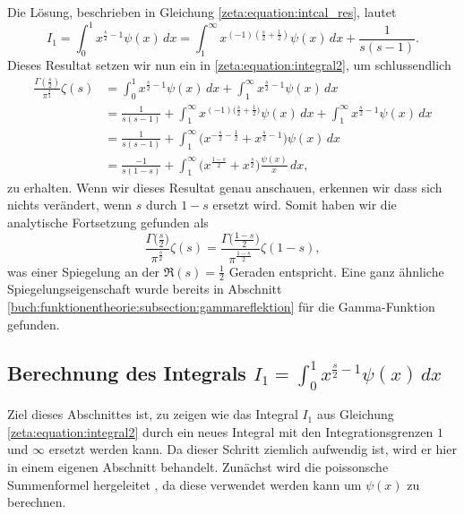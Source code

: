 Die Lösung, beschrieben in Gleichung \eqref{zeta:equation:intcal_res}, lautet
\begin{equation*}
    I_1
    =
    \int_0^{1}
    x^{\frac{s}{2}-1}
    \psi(x)
    \,dx
    =
    \int_{1}^{\infty}
    x^{(-1) (\frac{s}{2}+\frac{1}{2})}
    \psi(x)
    \,dx
    +
    \frac{1}{s(s-1)}.
\end{equation*}
Dieses Resultat setzen wir nun ein in \eqref{zeta:equation:integral2}, um schlussendlich
\begin{align}
    \frac{\Gamma ( \frac{s}{2} )}{\pi^{\frac{s}{2}}}
    \zeta(s)
    &=
    \int_0^{1}
    x^{\frac{s}{2}-1}
    \psi(x)
    \,dx
    +
    \int_1^{\infty}
    x^{\frac{s}{2}-1}
    \psi(x)
    \,dx
    \nonumber
    \\
    &=
    \frac{1}{s(s-1)}
    +
    \int_{1}^{\infty}
    x^{(-1) \biggl(\frac{s}{2}+\frac{1}{2}\biggr)}
    \psi(x)
    \,dx
    +
    \int_1^{\infty}
    x^{\frac{s}{2}-1}
    \psi(x)
    \,dx
    \\
    &=
    \frac{1}{s(s-1)}
    +
    \int_{1}^{\infty}
    \biggl(
    x^{-\frac{s}{2}-\frac{1}{2}}
    +
    x^{\frac{s}{2}-1}
    \biggr)
    \psi(x)
    \,dx
    \\
    &=
    \frac{-1}{s(1-s)}
    +
    \int_{1}^{\infty}
    \biggl(
    x^{\frac{1-s}{2}}
    +
    x^{\frac{s}{2}}
    \biggr)
    \frac{\psi(x)}{x}
    \,dx,
\end{align}
zu erhalten.
Wenn wir dieses Resultat genau anschauen, erkennen wir dass sich nichts verändert, wenn $s$ durch $1-s$ ersetzt wird.
Somit haben wir die analytische Fortsetzung gefunden als
\begin{equation}\label{zeta:equation:functional}
    \frac{\Gamma \biggl( \frac{s}{2} \biggr)}{\pi^{\frac{s}{2}}}
    \zeta(s)
    =
    \frac{\Gamma \biggl( \frac{1-s}{2} \biggr)}{\pi^{\frac{1-s}{2}}}
    \zeta(1-s),
\end{equation}
was einer Spiegelung an der $\Re(s) = \frac{1}{2}$ Geraden entspricht.
Eine ganz ähnliche Spiegelungseigenschaft wurde bereits in Abschnitt \ref{buch:funktionentheorie:subsection:gammareflektion} für die Gamma-Funktion gefunden.

\subsection{Berechnung des Integrals $I_1 = \int_0^{1} x^{\frac{s}{2}-1} \psi(x) \,dx$} \label{zeta:subsubsec:intcal}

Ziel dieses Abschnittes ist, zu zeigen wie das Integral $I_1$ aus Gleichung \eqref{zeta:equation:integral2} durch ein neues Integral mit den Integrationsgrenzen $1$ und $\infty$ ersetzt werden kann.
Da dieser Schritt ziemlich aufwendig ist, wird er hier in einem eigenen Abschnitt behandelt.
Zunächst wird die poissonsche Summenformel hergeleitet \cite{zeta:online:poisson}, da diese verwendet werden kann um $\psi(x)$ zu berechnen.
%

